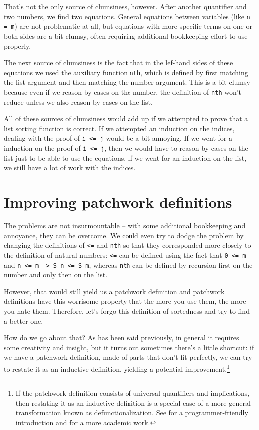 \documentclass[declaration,mgr,english,shortabstract]{iithesis}
\newcommand{\m}[1]{\texttt{#1}}
\begin{document}
That's not the only source of clumsiness, however. After another quantifier and two numbers, we find two equations. General equations between variables (like \m{n = m}) are not problematic at all, but equations with more specific terms on one or both sides are a bit clumsy, often requiring additional bookkeeping effort to use properly.

The next source of clumsiness is the fact that in the lef-hand sides of these equations we used the auxiliary function \m{nth}, which is defined by first matching the list argument and then matching the number argument. This is a bit clumsy because even if we reason by cases on the number, the definition of \m{nth} won't reduce unless we also reason by cases on the list.

All of these sources of clumsiness would add up if we attempted to prove that a list sorting function is correct. If we attempted an induction on the indices, dealing with the proof of \m{i <= j} would be a bit annoying. If we went for a induction on the proof of \m{i <= j}, then we would have to reason by cases on the list just to be able to use the equations. If we went for an induction on the list, we still have a lot of work with the indices.

\section{Improving patchwork definitions} \label{improvingpatchwork}

The problems are not insurmountable -- with some additional bookkeeping and annoyance, they can be overcome. We could even try to dodge the problem by changing the definitions of \m{<=} and \m{nth} so that they corresponded more closely to the definition of natural numbers: \m{<=} can be defined using the fact that \m{0 <= m} and \m{n <= m -> S n <= S m}, whereas \m{nth} can be defined by recursion first on the number and only then on the list.

However, that would still yield us a patchwork definition and patchwork definitions have this worrisome property that the more you use them, the more you hate them. Therefore, let's forgo this definition of sortedness and try to find a better one.

How do we go about that? As has been said previously, in general it requires some creativity and insight, but it turns out sometimes there's a little shortcut: if we have a patchwork definition, made of parts that don't fit perfectly, we can try to restate it as an inductive definition, yielding a potential improvement.\footnote{If the patchwork definition consists of universal quantifiers and implications, then restating it as an inductive definition is a special case of a more general transformation known as defunctionalization. See \cite{DefunctionalizationLight} for a programmer-friendly introduction and \cite{DefunctionalizationSerious} for a more academic work.}
\end{document}
